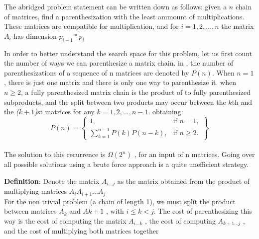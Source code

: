 The abridged problem statement can be written down as follows: given a $n$ chain of matrices,
find a parenthesization with the least ammount of multiplications. These matrices are compatible
for multiplication, and for $i = 1, 2, ..., n$ the matrix $A_i$ has dimension $p_{i-1} * p_i$


In order to better understand the search space for this problem, let us first count the number
of ways we can parenthesize a matrix chain. in \cite{cormen2009introduction}, the number of
parenthesizations of a sequence of n matrices are denoted by $P(n)$. When $n = 1$, there is just one matrix and there is only
one way to parenthesize it. when $n \geq 2$, a fully parenthesized matrix chain is the product of to 
fully parenthesized subproducts, and the split between two products may occur between the \emph{$k$}th and the
\emph{($k + 1$)}st matrices for any $k = 1, 2, ..., n-1$. obtaining:
  \\
  \[
    P(n) = \left\{\begin{array}{lr}
      1, & \text{if } n = 1,\\
      \sum_{k=1}^{n-1}P(k)P(n-k), & \text{if } n \geq 2.
      \end{array}\right\}
  \]
  \\


The solution to this recurrence is $\Omega (2^n)$ \cite{cormen2009introduction}, for an input of n matrices.
Going over all possible solutions using a brute force approach is a quite unefficient strategy.


\textbf{Definition}: Denote the matrix $A_{i...j}$ as the matrix obtained from the product of
multiplying matrices $A_i A_{i+1} ...A_j$
\\

For the non trivial problem (a chain of length 1), we must split the product between matrices
$A_k$ and $A {k+1}$ , with $i \leq k < j$. The cost of parenthesizing this way is the
cost of computing the matrix $A_{i...k}$ , the cost of computing $A_{k+1...j}$ , and
the cost of multiplying both matrices together
\\

\\

